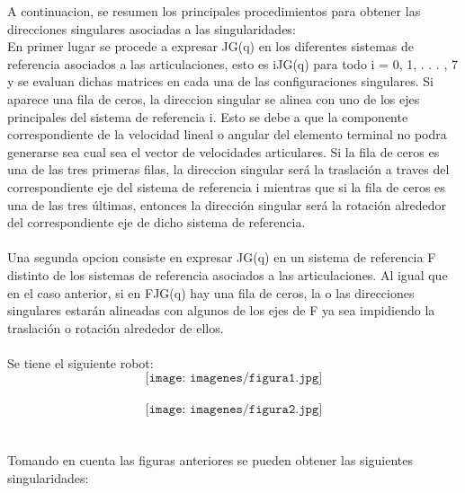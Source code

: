 \documentclass[12pt,a4paper]{report}
\begin{document}
A continuacion, se resumen los principales procedimientos para obtener las direcciones singulares asociadas a las singularidades:\\

En primer lugar se procede a expresar JG(q) en los diferentes sistemas de referencia asociados a las articulaciones, esto es iJG(q) para todo i = 0, 1, . . . , 7 y se evaluan dichas matrices en cada una de las configuraciones singulares. Si aparece una fila de ceros, la direccion singular se alinea con uno de los ejes principales del sistema de
referencia {i}. Esto se debe a que la componente correspondiente de la velocidad lineal o angular del elemento terminal no podra generarse sea cual sea el vector de velocidades articulares. Si la fila de ceros es una de las
tres primeras filas, la direccion singular será la traslación
a traves del correspondiente eje del sistema de referencia {i} mientras que si la fila de ceros es una de las tres
últimas, entonces la dirección singular será la rotación alrededor del correspondiente eje de dicho sistema de referencia.\\\\
Una segunda opcion consiste en expresar JG(q) en un sistema de referencia {F} distinto de los sistemas de referencia asociados a las articulaciones. Al igual que en el
caso anterior, si en FJG(q) hay una fila de ceros, la o las
direcciones singulares estarán alineadas con algunos de los ejes de {F} ya sea impidiendo la traslación o rotación alrededor de ellos.\\\\
Se tiene el siguiente robot:\\
$$\texttt{[image: imagenes/figura1.jpg]}$$\\
$$\texttt{[image: imagenes/figura2.jpg]} $$\\
\\Tomando en cuenta las figuras anteriores se pueden obtener las siguientes singularidades:\\\\
\end{document}
